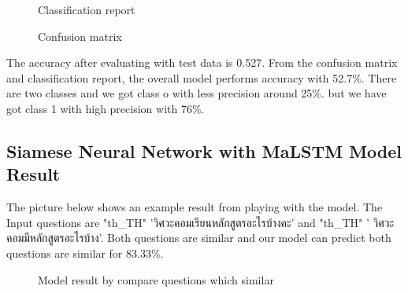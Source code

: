 \documentclass[12pt,oneside,openright,a4paper]{cpe-english-project}
\begin{document}
\begin{figure}[!h]\centering
{}
\caption{Classification report}\label{fig:Classification report}
\end{figure}
\begin{figure}[!h]\centering
{}
\caption{Confusion matrix}\label{fig:Confusion matrix}
\end{figure}

The accuracy after evaluating with test data is 0.527. From the confusion matrix and classification report, the overall model performs accuracy with 52.7\%. There are two classes and we got class o with less precision around 25\%. but we have got class 1 with high precision with 76\%.
\subsection{Siamese Neural Network with MaLSTM Model Result}

The picture below shows an example result from playing with the model. The Input questions are
{
\XeTeXlinebreaklocale "th_TH"	
\thaifont 
'วิศวะคอมเรียนหลักสูตรอะไรบ้างคะ' }
and
{
\XeTeXlinebreaklocale "th_TH"	
\thaifont 
 ' วิศวะคอมมีหลักสูตรอะไรบ้าง'. 
}Both questions are similar and our model can predict both questions are similar for 83.33\%.

\begin{figure}[!h]\centering
{}
\caption{Model result by compare questions which similar}\label{fig:Model result by compare questions which similar}
\end{figure}
\end{document}
